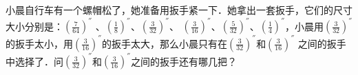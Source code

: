
小晨自行车有一个螺帽松了，她准备用扳手紧一下．她拿出一套扳手，它们的尺寸大小分别是：$(\frac{7}{64}) ^{''}$
、$(\frac{1}{8}) ^{''}$、$(\frac{3}{32}) ^{''}$、 $(\frac{3}{16}) ^{''}$、$(\frac{5}{32}) ^{''}$、$(\frac{1}{4}) ^{''}$，小晨用$(\frac{3}{32}) ^{''}$ 的扳手太小，用$(\frac{3}{16}) ^{''}$的扳手太大，那么小晨只有在$(\frac{3}{32}) ^{''}$和$(\frac{3}{16}) ^{''}$ 之间的扳手中选择了．问$(\frac{3}{32}) ^{''}$和$(\frac{3}{16}) ^{''}$之间的扳手还有哪几把？\\


